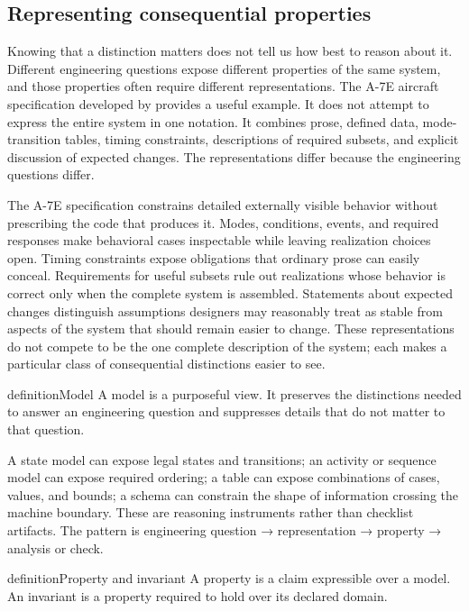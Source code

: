 \subsection{Representing consequential properties}\label{sec-representing-properties}

Knowing that a distinction matters does not tell us how best to reason about it. Different
engineering questions expose different properties of the same system, and those properties often
require different representations. The A-7E aircraft specification developed by \citet{alspaugh1992a7e}
provides a useful example. It does not attempt to express the entire system in one notation. It
combines prose, defined data, mode-transition tables, timing constraints, descriptions of required
subsets, and explicit discussion of expected changes. The representations differ because the
engineering questions differ.

The A-7E specification constrains detailed externally visible behavior without prescribing the code
that produces it. Modes, conditions, events, and required responses make behavioral cases
inspectable while leaving realization choices open. Timing constraints expose obligations that
ordinary prose can easily conceal. Requirements for useful subsets rule out realizations whose
behavior is correct only when the complete system is assembled. Statements about expected changes
distinguish assumptions designers may reasonably treat as stable from aspects of the system that
should remain easier to change. These representations do not compete to be the one complete
description of the system; each makes a particular class of consequential distinctions easier to
see.

\begin{bookbox}{definition}{Model} %
A model is a purposeful view. It preserves the distinctions needed to answer an engineering
question and suppresses details that do not matter to that question.
\end{bookbox}

A state model can expose legal states and transitions; an activity or sequence model can expose
required ordering; a table can expose combinations of cases, values, and bounds; a schema can
constrain the shape of information crossing the machine boundary. These are reasoning instruments
rather than checklist artifacts. The pattern is engineering question → representation → property →
analysis or check.

\begin{bookbox}{definition}{Property and invariant} %
A property is a claim expressible over a model. An invariant is a property required to hold over
its declared domain.
\end{bookbox}


